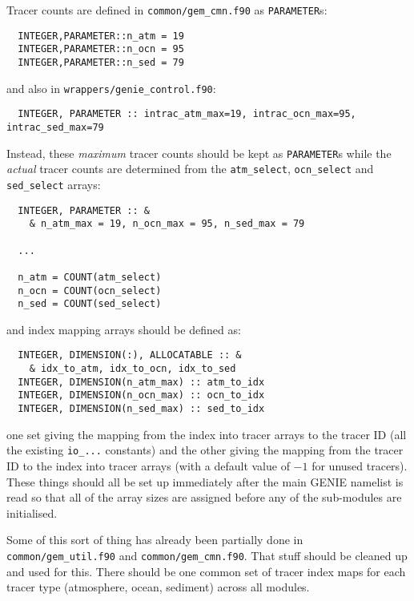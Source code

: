 \documentclass[a4paper,10pt,article]{memoir}
\begin{document}
Tracer counts are defined in \texttt{common/gem\_cmn.f90} as
\texttt{PARAMETER}s:

\begin{verbatim}
  INTEGER,PARAMETER::n_atm = 19
  INTEGER,PARAMETER::n_ocn = 95
  INTEGER,PARAMETER::n_sed = 79
\end{verbatim}

and also in \texttt{wrappers/genie\_control.f90}:

\begin{verbatim}
  INTEGER, PARAMETER :: intrac_atm_max=19, intrac_ocn_max=95, intrac_sed_max=79
\end{verbatim}

Instead, these \emph{maximum} tracer counts should be kept as
\texttt{PARAMETER}s while the \emph{actual} tracer counts are
determined from the \texttt{atm\_select}, \texttt{ocn\_select} and
\texttt{sed\_select} arrays:

\begin{verbatim}
  INTEGER, PARAMETER :: &
    & n_atm_max = 19, n_ocn_max = 95, n_sed_max = 79

  ...

  n_atm = COUNT(atm_select)
  n_ocn = COUNT(ocn_select)
  n_sed = COUNT(sed_select)
\end{verbatim}

and index mapping arrays should be defined as:

\begin{verbatim}
  INTEGER, DIMENSION(:), ALLOCATABLE :: &
    & idx_to_atm, idx_to_ocn, idx_to_sed
  INTEGER, DIMENSION(n_atm_max) :: atm_to_idx
  INTEGER, DIMENSION(n_ocn_max) :: ocn_to_idx
  INTEGER, DIMENSION(n_sed_max) :: sed_to_idx
\end{verbatim}

one set giving the mapping from the index into tracer arrays to the
tracer ID (all the existing \texttt{io\_...} constants) and the other
giving the mapping from the tracer ID to the index into tracer arrays
(with a default value of $-1$ for unused tracers).  These things
should all be set up immediately after the main GENIE namelist is read
so that all of the array sizes are assigned before any of the
sub-modules are initialised.

Some of this sort of thing has already been partially done in
\texttt{common/gem\_util.f90} and \texttt{common/gem\_cmn.f90}.  That
stuff should be cleaned up and used for this.  There should be one
common set of tracer index maps for each tracer type (atmosphere,
ocean, sediment) across all modules.
\end{document}
